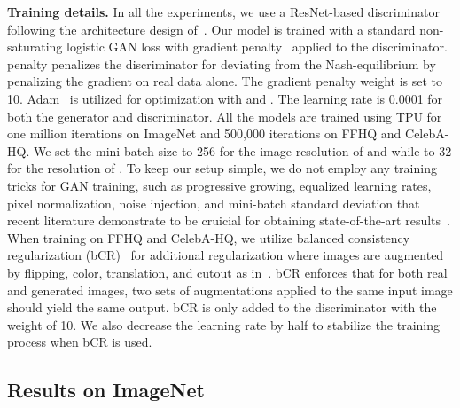 \documentclass{article}
\newcommand{\p}[1]{\textbf{#1.}}
\begin{document}
\p{Training details} In all the experiments, we use a ResNet-based discriminator following the architecture design of~\cite{karras2020analyzing}. Our model is trained with a standard non-saturating logistic GAN loss with  gradient penalty~\cite{mescheder2018training} applied to the discriminator.  penalty penalizes the discriminator for deviating from the Nash-equilibrium by penalizing the gradient on real data alone. The gradient penalty weight is set to 10. Adam~\cite{kingma2014adam} is utilized for optimization with  and . The learning rate is 0.0001 for both the generator and discriminator. All the models are trained using TPU for one million iterations on ImageNet and 500,000 iterations on FFHQ and CelebA-HQ. We set the mini-batch size to 256 for the image resolution of  and  while to 32 for the resolution of . To keep our setup simple, we do not employ any training tricks for GAN training, such as progressive growing, equalized learning rates, pixel normalization, noise injection, and mini-batch standard deviation that recent literature demonstrate to be cruicial for obtaining state-of-the-art results~\cite{karras2018progressive,karras2020analyzing}. When training on FFHQ and CelebA-HQ, we utilize balanced consistency regularization (bCR)~\cite{zhang2020consistency,zhao2021improved} for additional regularization where images are augmented by flipping, color, translation, and cutout as in~\cite{zhao2020differentiable}. bCR enforces that for both real and generated images, two sets of augmentations applied to the same input image should yield the same output. bCR is only added to the discriminator with the weight of 10. We also decrease the learning rate by half to stabilize the training process when bCR is used. 

\subsection{Results on ImageNet}
\end{document}
